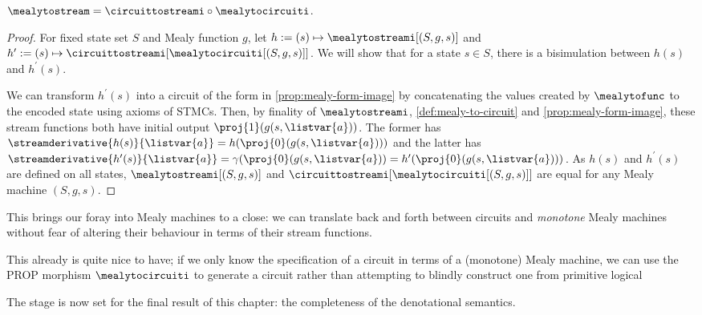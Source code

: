 \begin{theorem}\label{thm:mealy-to-circuit}
    \(
        \mealytostream = \circuittostreami \circ \mealytocircuiti
    \).
\end{theorem}
\begin{proof}
    For fixed state set \(S\) and Mealy function \(g\), let
    \(h := (s) \mapsto \mealytostreami[(S, g, s)]\) and \(
        h^\prime := (s) \mapsto \circuittostreami[\mealytocircuiti[(S, g, s)]]
    \).
    We will show that for a state \(s \in S\), there is a bisimulation
    between \(h(s)\) and \(h^\prime(s)\).

    We can transform \(h^\prime(s)\) into a circuit of the form in
    \cref{prop:mealy-form-image} by concatenating the values created by
    \(\mealytofunc\) to the encoded state using axioms of STMCs.
    Then, by finality of \(\mealytostreami\), \cref{def:mealy-to-circuit} and
    \cref{prop:mealy-form-image}, these stream functions both have initial output \(
        \proj{1}(g(s, \listvar{a}))
    \).
    The former has \(
        \streamderivative{h(s)}{\listvar{a}} = h(\proj{0}(g(s, \listvar{a})))
    \) and the latter has \(
        \streamderivative{h^\prime(s)}{\listvar{a}} =
            \gamma(\proj{0}(g(s, \listvar{a})) =
            h^\prime(\proj{0}(g(s, \listvar{a})))
    \).
    As \(h(s)\) and \(h^\prime(s)\) are defined on all states,
    \(\mealytostreami[(S, g, s)]\) and
    \(\circuittostreami[\mealytocircuiti[(S, g, s)]]\) are equal for any Mealy
    machine \((S, g, s)\).
\end{proof}


This brings our foray into Mealy machines to a close: we can translate back and
forth between circuits and \emph{monotone} Mealy machines without fear of
altering their behaviour in terms of their stream functions.

This already is quite nice to have; if we only know the specification of a
circuit in terms of a (monotone) Mealy machine, we can use the PROP morphism
\(\mealytocircuiti\) to generate a circuit rather than attempting to blindly
construct one from primitive logical

The stage is now set for the final result of this chapter: the completeness of
the denotational semantics.